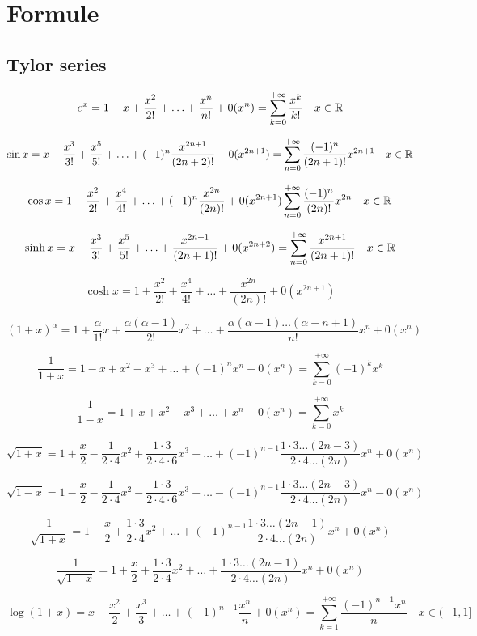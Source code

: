 \chapter{Formule}
\section{Tylor series}
$$
e^x
= 1+x+\frac{ x^2}{2!}
+ \ldots +
\frac{ x^n}{n!}
+0(x^n)
=\sum_{k=0}^{+\infty}\frac{ x^k}{k!}
\quad x \in \mathbb{R}
$$

$$
\sin x=x-\frac{ x^3}{3!}+\frac{ x^5}{5!}+\ldots+ (-1)^n \frac{x^{2n+1}}{(2n+2)!}+
0(x^{2n+1})
=
\sum_{n=0}^{+\infty} \frac{(-1)^n}{(2n+1)!} x^{2n+1}
\quad x \in \mathbb{R}
$$

$$
\cos x =
1 - \frac{ x^2}{2!} + \frac{ x^4}{4!}
+ \ldots +
(-1)^n \frac{ x^{2n}}{(2n)!} + 0(x^{2n+1})
\sum_{n=0}^{+\infty} \frac{(-1)^n}{(2n)!} x^{2n}
\quad x \in \mathbb{R}
$$

$$
\sinh x=x + \frac{ x^3}{3!}+\frac{ x^5}{5!}+\ldots+ \frac{x^{2n+1}}{(2n+1)!}+
0(x^{2n+2})
=
\sum_{n=0}^{+\infty} \frac{x^{2n+1}}{(2n+1)!}
\quad x \in \mathbb{R}
$$

$$
\cosh x =
1 + \frac{ x^2}{2!} + \frac{ x^4}{4!}
+ \ldots +
\frac{ x^{2n}}{(2n)!} + 0(x^{2n+1})
$$

$$
(1+x)^\alpha = 1+\frac{ \alpha}{1!}x + \frac{ \alpha(\alpha-1)}{2!}x^2
+\ldots+
\frac{ \alpha(\alpha-1)\ldots(\alpha-n+1)}{n!}x^n+
0(x^n)
$$

$$
\frac{ 1}{1+x}= 1 -x +x^2-x^3+\ldots +(-1)^n x^n +0(x^n)=\sum_{k=0}^{+\infty}(-1)^kx^k
$$

$$
\frac{ 1}{1-x}= 1 +x +x^2-x^3+\ldots +x^n +0(x^n)=\sum_{k=0}^{+\infty}x^k
$$

$$
\sqrt{1+x}= 1+\frac{ x}{2}-\frac{ 1}{2\cdot 4}x^2+ \frac{ 1\cdot3}{2\cdot4\cdot6}x^3
+\ldots+
(-1)^{n-1} \frac{1\cdot3\ldots(2n-3)}{2\cdot4\ldots(2n)}x^n +0(x^n)
$$

$$
\sqrt{1-x}= 1-\frac{ x}{2}-\frac{ 1}{2\cdot 4}x^2- \frac{ 1\cdot3}{2\cdot4\cdot6}x^3
-\ldots-
(-1)^{n-1} \frac{1\cdot3\ldots(2n-3)}{2\cdot4\ldots(2n)}x^n -0(x^n)
$$

$$
\frac{ 1}{\sqrt{1+x}}
= 1-\frac{ x}{2}+\frac{ 1\cdot3}{2\cdot 4}x^2
+\ldots+
(-1)^{n-1} \frac{1\cdot3\ldots(2n-1)}{2\cdot4\ldots(2n)}x^n +0(x^n)
$$

$$
\frac{ 1}{\sqrt{1-x}}
= 1+\frac{ x}{2}+\frac{ 1\cdot3}{2\cdot 4}x^2
+\ldots+
\frac{1\cdot3\ldots(2n-1)}{2\cdot4\ldots(2n)}x^n +0(x^n)
$$

$$
\log (1+x)=
x-\frac{ x^2}{2}+\frac{ x^3}{3}+\ldots+ (-1)^{n-1} \frac{ x^n}{n}+0(x^n)
=\sum_{k=1}^{+\infty}\frac{(-1)^{n-1}x^n}{n}
\quad x\in(-1,1]
$$

